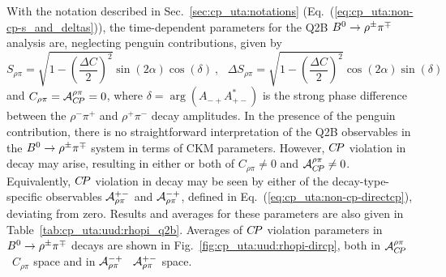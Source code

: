 With the notation described in Sec.~\ref{sec:cp_uta:notations}
(Eq.~(\ref{eq:cp_uta:non-cp-s_and_deltas})), 
the time-dependent parameters for the Q2B $B^0 \to \rho^\pm\pi^\mp$ analysis are,
neglecting penguin contributions, given by
\begin{equation}
  S_{\rho\pi} = 
  \sqrt{1 - \left(\frac{\Delta C}{2}\right)^2}\sin(2\alpha)\cos(\delta)
  \ , \ \ \ 
  \Delta S_{\rho\pi} = 
  \sqrt{1 - \left(\frac{\Delta C}{2}\right)^2}\cos(2\alpha)\sin(\delta)
\end{equation} 
and $C_{\rho\pi} = {\cal A}_{C\!P}^{\rho\pi} = 0$,
where $\delta=\arg(A_{-+}A^*_{+-})$ is the strong phase difference 
between the $\rho^-\pi^+$ and $\rho^+\pi^-$ decay amplitudes.
In the presence of the penguin contribution, there is no straightforward 
interpretation of the Q2B observables in the $B^0 \to \rho^\pm\pi^\mp$ system
in terms of CKM parameters.
However, $C\!P$ violation in decay may arise,
resulting in either or both of $C_{\rho\pi} \neq 0$ and ${\cal A}_{C\!P}^{\rho\pi} \neq 0$.
Equivalently,
$C\!P$ violation in decay may be seen by either of
the decay-type-specific observables ${\cal A}^{+-}_{\rho\pi}$ 
and ${\cal A}^{-+}_{\rho\pi}$, defined in Eq.~(\ref{eq:cp_uta:non-cp-directcp}), 
deviating from zero.
Results and averages for these parameters
are also given in Table~\ref{tab:cp_uta:uud:rhopi_q2b}.
Averages of $C\!P$ violation parameters in $B^0 \to \rho^\pm\pi^\mp$ decays
are shown in Fig.~\ref{fig:cp_uta:uud:rhopi-dircp},
both in 
${\cal A}^{\rho\pi}_{C\!P}$ \vs\ $C_{\rho\pi}$ space and in 
${\cal A}^{-+}_{\rho\pi}$ \vs\ ${\cal A}^{+-}_{\rho\pi}$ space.

